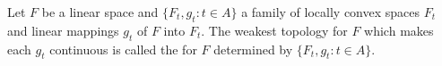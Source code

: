 Let $F$ be a linear space and $\{F_t, g_t : t \in A\}$ a family of locally convex spaces $F_t$ and linear mappings $g_t$ of $F$ into $F_t$. The weakest topology for $F$ which makes each $g_t$ continuous is called the  for $F$ determined by $\{F_t, g_t : t \in A\}$.
